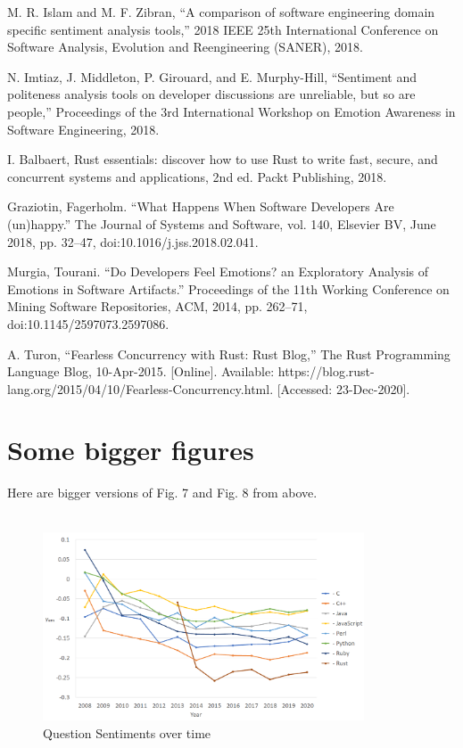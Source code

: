 \documentclass[conference]{IEEEtran}
\begin{document}
\begin{thebibliography}{00}
 M. R. Islam and M. F. Zibran, “A comparison of software engineering domain specific sentiment analysis tools,” 2018 IEEE 25th International Conference on Software Analysis, Evolution and Reengineering (SANER), 2018. 

 N. Imtiaz, J. Middleton, P. Girouard, and E. Murphy-Hill, “Sentiment and politeness analysis tools on developer discussions are unreliable, but so are people,” Proceedings of the 3rd International Workshop on Emotion Awareness in Software Engineering, 2018. 

 I. Balbaert, Rust essentials: discover how to use Rust to write fast, secure, and concurrent systems and applications, 2nd ed. Packt Publishing, 2018. 

 Graziotin, Fagerholm. “What Happens When Software Developers Are (un)happy.” The Journal of Systems and Software, vol. 140, Elsevier BV, June 2018, pp. 32–47, doi:10.1016/j.jss.2018.02.041.

 Murgia, Tourani. “Do Developers Feel Emotions? an Exploratory Analysis of Emotions in Software Artifacts.” Proceedings of the 11th Working Conference on Mining Software Repositories, ACM, 2014, pp. 262–71, doi:10.1145/2597073.2597086.

 A. Turon, “Fearless Concurrency with Rust: Rust Blog,” The Rust Programming Language Blog, 10-Apr-2015. [Online]. Available: https://blog.rust-lang.org/2015/04/10/Fearless-Concurrency.html. [Accessed: 23-Dec-2020]. \\

\end{thebibliography}

\onecolumn
\appendices
\section{Some bigger figures}
Here are bigger versions of Fig. 7 and Fig. 8 from above.\\\\
\begin{figure}[htbp]
\centering
\includegraphics[width=0.85\textwidth]{figures/time_questions_em.png}
\caption{Question Sentiments over time}
\label{fig}
\end{figure}
\end{document}
